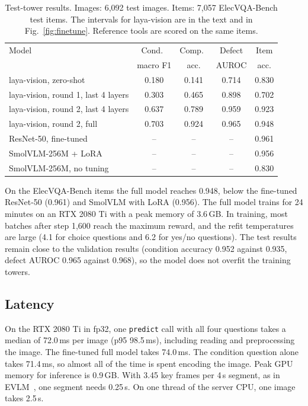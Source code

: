 \documentclass[preprint,12pt]{elsarticle}
\begin{document}
\begin{table}[t]
\centering
\caption{Test-tower results. Images: 6,092 test images. Items: 7,057 ElecVQA-Bench test items. The intervals for laya-vision are in the text and in Fig.~\ref{fig:finetune}. Reference tools are scored on the same items.}
\label{tab:finetune}
\footnotesize
\setlength{\tabcolsep}{4pt}
\begin{tabular}{lcccc}
\toprule
Model & Cond.\ & Comp.\ & Defect & Item \\
 & macro F1 & acc. & AUROC & acc. \\
\midrule
laya-vision, zero-shot & 0.180 & 0.141 & 0.714 & 0.830 \\
laya-vision, round 1, last 4 layers & 0.303 & 0.465 & 0.898 & 0.702 \\
laya-vision, round 2, last 4 layers & 0.637 & 0.789 & 0.959 & 0.923 \\
laya-vision, round 2, full & 0.703 & 0.924 & 0.965 & 0.948 \\
\midrule
ResNet-50, fine-tuned & -- & -- & -- & 0.961 \\
SmolVLM-256M + LoRA & -- & -- & -- & 0.956 \\
SmolVLM-256M, no tuning & -- & -- & -- & 0.830 \\
\bottomrule
\end{tabular}
\end{table}

On the ElecVQA-Bench items the full model reaches 0.948, below the fine-tuned ResNet-50 (0.961) and SmolVLM with LoRA (0.956). The full model trains for 24 minutes on an RTX 2080 Ti with a peak memory of 3.6\,GB. In training, most batches after step 1,600 reach the maximum reward, and the refit temperatures are large (4.1 for choice questions and 6.2 for yes/no questions). The test results remain close to the validation results (condition accuracy 0.952 against 0.935, defect AUROC 0.965 against 0.968), so the model does not overfit the training towers.

\subsection{Latency}

On the RTX 2080 Ti in fp32, one \texttt{predict} call with all four questions takes a median of 72.0\,ms per image (p95 98.5\,ms), including reading and preprocessing the image. The fine-tuned full model takes 74.0\,ms. The condition question alone takes 71.4\,ms, so almost all of the time is spent encoding the image. Peak GPU memory for inference is 0.9\,GB. With 3.45 key frames per 4\,s segment, as in EVLM~\cite{evlm}, one segment needs 0.25\,s. On one thread of the server CPU, one image takes 2.5\,s.
\end{document}
